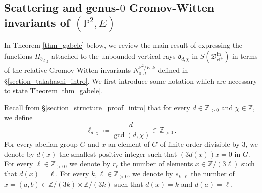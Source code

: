 \documentclass[11pt,letterpaper]{amsart}
\newtheorem{defn}{Definition}[section]
\newcommand\PP{\mathbb P}
\newcommand\Z{\mathbb Z}
\newcommand\fd{\mathfrak d}
\newcommand\fD{\mathfrak D}
\newcommand\Pic{\operatorname{Pic}}
\newcommand\cl{\operatorname{cl}}
\newcommand\iin{\mathrm{in}}
\begin{document}
\subsection{Scattering and genus-$0$ Gromov-Witten invariants of $(\PP^2,E)$} \label{section_vertical_gw}

In Theorem \ref{thm_gabele} below, we review the main result of 
\cite{gabele2019tropical} expressing the functions $H_{\fd_{d,\chi}}$ attached to the unbounded vertical rays 
$\fd_{d,\chi}$ in $S(\fD^\iin_{\cl^+})$ in terms of the relative Gromov-Witten invariants $N_{0,d}^{\PP^2/E,k}$ defined in \S \ref{section_takahashi_intro}.
We first introduce some notation
which are necessary to state Theorem 
\ref{thm_gabele}.

Recall from \S \ref{section_structure_proof_intro} that
for every $d \in \Z_{>0}$ and $\chi \in \Z$, we define
\[ \ell_{d,\chi} \coloneq \frac{d}{\gcd(d,\chi)} \in  \Z_{>0}\,.\]
For every abelian group $G$ and $x$ an element of $G$ of finite order divisible by $3$, we denote by $d(x)$ the smallest positive integer such that 
$(3d(x))x=0$ in $G$.
For every $\ell \in \Z_{>0}$, we denote by $r_\ell$ the number of elements $x \in \Z/(3\ell)$ such that $d(x)=\ell$.
For every $k, \ell \in \Z_{>0}$, we denote by
$s_{k,\ell}$ the number of $x=(a,b)
\in \Z/(3k) \times \Z/(3k)$
such that 
$d(x)=k$ and $d(a)=\ell$.








\end{document}
